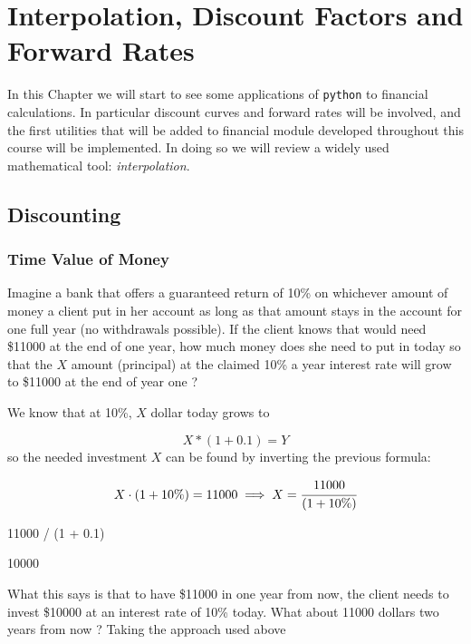 \chapter{Interpolation, Discount Factors and Forward Rates}
\label{interpolation}

In this Chapter we will start to see some applications of \texttt{python} to financial calculations.
In particular discount curves and forward rates will be involved, and the first utilities that will be added to financial module developed throughout this course will be implemented.
In doing so we will review a widely used mathematical tool: \emph{interpolation}.

\section{Discounting}
\label{discount-factors}

\subsection{Time Value of Money}
Imagine a bank that offers a guaranteed return of 10\% on whichever amount of money a client put in her account as long as that amount stays in the account for one full year (no withdrawals possible). If the client knows that would need \$11000 at the end of one year, how much money does she need to put in today so that the $X$ amount (principal) at the claimed 10\% a year interest rate will grow to \$11000 at the end of year one ?

We know that at 10\%, $X$ dollar today grows to

\begin{equation}
X * (1 + 0.1) = Y
\end{equation}
so the needed investment $X$ can be found by inverting the previous formula:

\begin{equation*}
X \cdot (1 + 10\%) = 11000 \implies X = \cfrac{11000}{(1 + 10\%)}
\end{equation*}

\begin{ipython}
11000 / (1 + 0.1)
\end{ipython}
\begin{ioutput}
10000
\end{ioutput}

What this says is that to have \$11000 in one year from now, the client needs to invest \$10000 at an interest rate of 10\% today.
What about 11000 dollars two years from now ? Taking the approach used above


